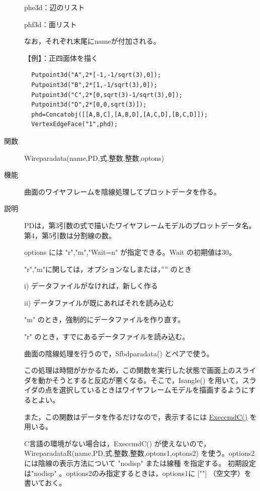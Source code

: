 \documentclass[papersize,a4paper,12pt,uplatex]{jsarticle}
\begin{document}
\begin{description}
phe3d：辺のリスト

phf3d：面リスト

なお，それぞれ末尾にnameが付加される。

\vspace{\baselineskip}
【例】：正四面体を描く
\begin{verbatim}
  Putpoint3d("A",2*[-1,-1/sqrt(3),0]);
  Putpoint3d("B",2*[1,-1/sqrt(3),0]);
  Putpoint3d("C",2*[0,sqrt(3)-1/sqrt(3),0]);
  Putpoint3d("D",2*[0,0,sqrt(3)]);
  phd=Concatobj([[A,B,C],[A,B,D],[A,C,D],[B,C,D]]);
  VertexEdgeFace("1",phd);
\end{verbatim}
        \begin{center}  \end{center}

\hypertarget{wireparadata}{}
\item[関数]  Wireparadata(name,PD,式,整数,整数,optons)
\item[機能]  曲面のワイヤフレームを陰線処理してプロットデータを作る。
\item[説明]  PDは，第3引数の式で描いたワイヤフレームモデルのプロットデータ名。第4，第5引数は分割線の数。

options には "r","m","Wait=n" が指定できる。Wait の初期値は30。

  "r","m"に関しては，オプションなしまたは，”” のとき
  
    i) データファイルがなければ，新しく作る
    
    ii) データファイルが既にあればそれを読み込む
    
  "m"  のとき，強制的にデータファイルを作り直す。
  
  "r" のとき，すでにあるデータファイルを読み込む。
  
曲面の陰線処理を行うので，Sfbdparadata() とペアで使う。

この処理は時間がかかるため，この関数を実行した状態で画面上のスライダを動かそうとすると反応が悪くなる。そこで，Isangle() を用いて，スライダの点を選択しているときはワイヤフレームモデルを描画するようにするとよい。

また，この関数はデータを作るだけなので，表示するには \hyperlink{execcmdc}{ExeccmdC()} を用いる。

C言語の環境がない場合は，ExeccmdC() が使えないので，WireparadataR(name,PD,式,整数,整数,optons1,optons2) を使う。options2には陰線の表示方法について "nodisp" または線種 を指定する。 初期設定は"nodisp" 。options2のみ指定するときは，options1に [""] （空文字）を書いておく。



\end{description}
\end{document}
